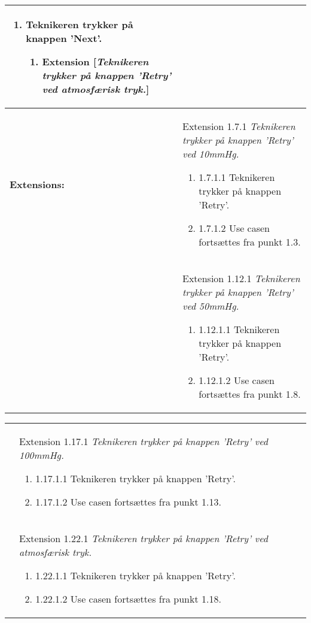 \begin{table}[H]
\begin{tabular}{|p{5.5cm}|p{10cm}|}
\begin{enumerate}
\item[\labelname{1.22}]{Teknikeren trykker på knappen 'Next'.
\begin{enumerate}
\item[\labelname{1.22.1}] Extension [\textit{Teknikeren trykker på knappen 'Retry' ved atmosfærisk tryk.}]
\end{enumerate}}
\end{enumerate}
\\\hline
\textbf{Extensions:}& Extension 1.7.1 \textit{Teknikeren trykker på knappen 'Retry' ved 10mmHg.}
\begin{enumerate}
\setlength\itemsep{0.1em}
\item[\labelname]1.7.1.1   Teknikeren trykker på knappen 'Retry'.
\item[\labelname]1.7.1.2   Use casen fortsættes fra punkt 1.3. 
\end{enumerate}
\\
& Extension 1.12.1 \textit{Teknikeren trykker på knappen 'Retry' ved 50mmHg.}
\begin{enumerate}
\setlength\itemsep{0.1em}
\item[\labelname]1.12.1.1   Teknikeren trykker på knappen 'Retry'.
\item[\labelname]1.12.1.2   Use casen fortsættes fra punkt 1.8. 
\end{enumerate}
\\\hline
\end{tabular}
\end{table}

\begin{table}[H]
\begin{tabular}{|p{5.5cm}|p{10cm}|}
\hline
& Extension 1.17.1 \textit{Teknikeren trykker på knappen 'Retry' ved 100mmHg.}
\begin{enumerate}
\setlength\itemsep{0.1em}
\item[\labelname]1.17.1.1   Teknikeren trykker på knappen 'Retry'.
\item[\labelname]1.17.1.2   Use casen fortsættes fra punkt 1.13. 
\end{enumerate}
\\
& Extension 1.22.1 \textit{Teknikeren trykker på knappen 'Retry' ved atmosfærisk tryk.}
\begin{enumerate}
\setlength\itemsep{0.1em}
\item[\labelname]1.22.1.1   Teknikeren trykker på knappen 'Retry'.
\item[\labelname]1.22.1.2   Use casen fortsættes fra punkt 1.18. 
\end{enumerate}
\\\hline
\end{tabular}
\end{table}
